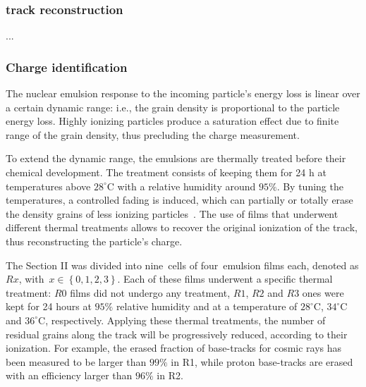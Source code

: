 \documentclass[utf8]{frontiersFPHY} %
\begin{document}
\newline
\subsubsection{track reconstruction}
...

\newline
\subsubsection{Charge identification}

The nuclear emulsion response to the incoming particle's energy loss is linear over a certain dynamic range: i.e., the grain density is proportional to the particle energy loss. Highly ionizing particles produce a saturation effect due to finite range of the grain density, thus precluding the charge measurement.

To extend the dynamic range, the emulsions are thermally treated before their chemical development. The treatment consists of keeping them for 24 h at temperatures above $28^{\circ}$C with a relative humidity around $95\%$. By tuning the temperatures, a controlled fading is induced, which can partially or totally erase the density grains of less ionizing particles~\cite{Nakamura2006}. The use of films that underwent different thermal treatments allows to recover the original ionization of the track, thus reconstructing the particle's charge.

The Section II was divided into nine~cells of four~emulsion films each, denoted as $Rx$, with~$x \in \left \{0,1,2,3\right \}$. Each of these films underwent a specific thermal treatment: $R0$ films did not undergo any treatment, $R1$, $R2$ and $R3$ ones were kept for 24 hours at $95\%$ relative humidity and at a temperature of $28^{\circ}$C, $34^{\circ}$C and $36^{\circ}$C, respectively. Applying these thermal treatments, the number of residual grains along the track will be progressively reduced, according to their ionization. 
For example, the erased fraction of base-tracks for cosmic rays has been measured to be larger than $99\%$ in R1, while proton base-tracks are erased with an efficiency larger than $96\%$ in R2.
\\
\end{document}
